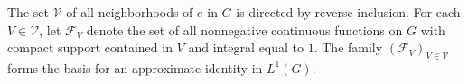 \begin{definition}
The set $\mathcal{V}$ of all neighborhoods of $e$ in $G$ is directed by reverse inclusion. For each $V \in \mathcal{V}$, let $\mathcal{F}_V$ denote the set of all nonnegative continuous functions on $G$ with compact support contained in $V$ and integral equal to $1$. The family $(\mathcal{F}_V)_{V \in \mathcal{V}}$ forms the basis for an approximate identity in $L^1(G)$.
\end{definition}
